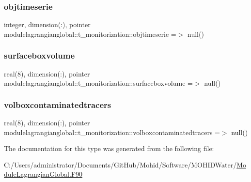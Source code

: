 \subsubsection{\texorpdfstring{objtimeserie}{objtimeserie}}
{\footnotesize\ttfamily integer, dimension(\+:), pointer modulelagrangianglobal\+::t\+\_\+monitorization\+::objtimeserie =$>$ null()\hspace{0.3cm}{\ttfamily [private]}}

\mbox{\label{structmodulelagrangianglobal_1_1t__monitorization_a321eb068accb5c4898564e6f496eb411}} 
\subsubsection{\texorpdfstring{surfaceboxvolume}{surfaceboxvolume}}
{\footnotesize\ttfamily real(8), dimension(\+:), pointer modulelagrangianglobal\+::t\+\_\+monitorization\+::surfaceboxvolume =$>$ null()\hspace{0.3cm}{\ttfamily [private]}}

\mbox{\label{structmodulelagrangianglobal_1_1t__monitorization_addfdbdbea01542920ceb4def2e9fe9b1}} 
\subsubsection{\texorpdfstring{volboxcontaminatedtracers}{volboxcontaminatedtracers}}
{\footnotesize\ttfamily real(8), dimension(\+:), pointer modulelagrangianglobal\+::t\+\_\+monitorization\+::volboxcontaminatedtracers =$>$ null()\hspace{0.3cm}{\ttfamily [private]}}



The documentation for this type was generated from the following file\+:\begin{DoxyCompactItemize}
\item 
C\+:/\+Users/administrator/\+Documents/\+Git\+Hub/\+Mohid/\+Software/\+M\+O\+H\+I\+D\+Water/\mbox{\hyperlink{_module_lagrangian_global_8_f90}{Module\+Lagrangian\+Global.\+F90}}\end{DoxyCompactItemize}
